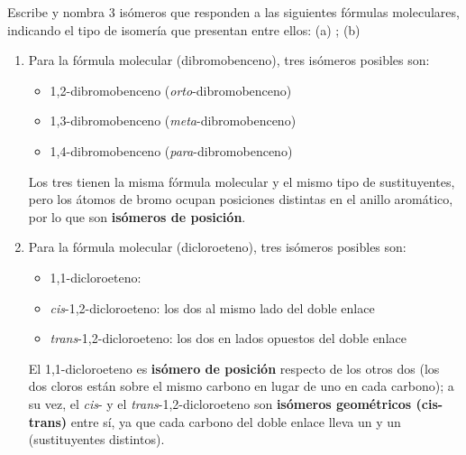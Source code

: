 \begin{exerciseEVAU}
    Escribe y nombra 3 isómeros que responden a las siguientes fórmulas moleculares, indicando el tipo de isomería que presentan entre ellos: (a) ; (b) 
    \vspace*{8pt}

    \begin{solu}


        \begin{enumerate}[label=\letraminuscula]
            \item Para la fórmula molecular  (dibromobenceno), tres isómeros posibles son:
            \begin{itemize}
                \item 1,2-dibromobenceno (\emph{orto}-dibromobenceno)
                \item 1,3-dibromobenceno (\emph{meta}-dibromobenceno)
                \item 1,4-dibromobenceno (\emph{para}-dibromobenceno)
            \end{itemize}
            Los tres tienen la misma fórmula molecular y el mismo tipo de sustituyentes, pero los átomos de bromo ocupan posiciones distintas en el anillo aromático, por lo que son \textbf{isómeros de posición}.

            \item Para la fórmula molecular  (dicloroeteno), tres isómeros posibles son:
            \begin{itemize}
                \item 1,1-dicloroeteno: 
                \item \emph{cis}-1,2-dicloroeteno: los dos  al mismo lado del doble enlace 
                \item \emph{trans}-1,2-dicloroeteno: los dos  en lados opuestos del doble enlace 
            \end{itemize}
            El 1,1-dicloroeteno es \textbf{isómero de posición} respecto de los otros dos (los dos cloros están sobre el mismo carbono en lugar de uno en cada carbono); a su vez, el \emph{cis}- y el \emph{trans}-1,2-dicloroeteno son \textbf{isómeros geométricos (cis-trans)} entre sí, ya que cada carbono del doble enlace lleva un  y un  (sustituyentes distintos).
        \end{enumerate}
    \end{solu}
\end{exerciseEVAU}

